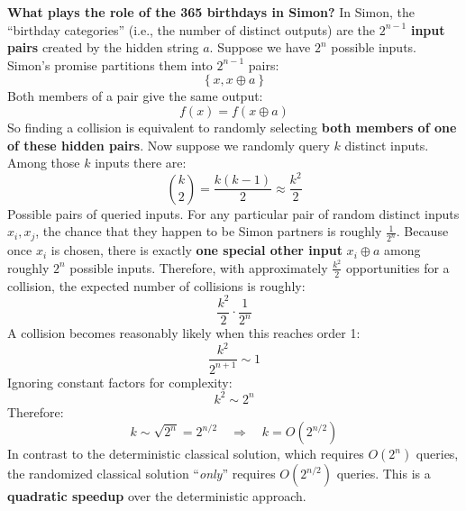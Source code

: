 \highspace
\textcolor{Red2}{ \textbf{What plays the role of the 365 birthdays in Simon?}} In Simon, the ``birthday categories'' (i.e., the number of distinct outputs) are the $2^{n-1}$ \textbf{input pairs} created by the hidden string $a$. Suppose we have $2^{n}$ possible inputs. Simon's promise partitions them into $2^{n-1}$ pairs:
\begin{equation*}
    \left\{
        x, x \oplus a
    \right\}
\end{equation*}
Both members of a pair give the same output:
\begin{equation*}
    f(x) = f(x \oplus a)
\end{equation*}
So finding a collision is equivalent to randomly selecting \textbf{both members of one of these hidden pairs}. Now suppose we randomly query $k$ distinct inputs. Among those $k$ inputs there are:
\begin{equation*}
    \binom{k}{2} = \frac{k(k-1)}{2} \approx \frac{k^2}{2}
\end{equation*}
Possible pairs of queried inputs. For any particular pair of random distinct inputs $x_i,x_j$, the chance that they happen to be Simon partners is roughly $\frac{1}{2^{n}}$. Because once $x_i$ is chosen, there is exactly \textbf{one special other input} $x_i \oplus a$ among roughly $2^{n}$ possible inputs. Therefore, with approximately $\frac{k^2}{2}$ opportunities for a collision, the expected number of collisions is roughly:
\begin{equation*}
    \frac{k^2}{2} \cdot \frac{1}{2^{n}}
\end{equation*}
A collision becomes reasonably likely when this reaches order 1:
\begin{equation*}
    \frac{k^2}{2^{n+1}} \sim 1
\end{equation*}
Ignoring constant factors for complexity:
\begin{equation*}
    k^2 \sim 2^{n}
\end{equation*}
Therefore:
\begin{equation}
    k \sim \sqrt{2^{n}} = 2^{n/2} \quad \Rightarrow \quad k = O(2^{n/2})
\end{equation}
In contrast to the deterministic classical solution, which requires $O(2^n)$ queries, the randomized classical solution ``\emph{only}'' requires $O(2^{n/2})$ queries. This is a \textbf{quadratic speedup} over the deterministic approach.

